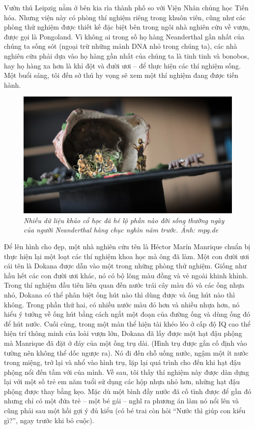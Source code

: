 \begin{multicols}{2}
	Vườn thú Leipzig nằm ở bên kia rìa thành phố so với Viện Nhân chủng học Tiến hóa. Nhưng viện này có phòng thí nghiệm riêng trong khuôn viên, cũng như các phòng thử nghiệm được thiết kế đặc biệt bên trong ngôi nhà nghiên cứu về vượn, được gọi là Pongoland. Vì không ai trong số họ hàng Neanderthal gần nhất của chúng ta sống sót (ngoại trừ những mảnh DNA nhỏ trong chúng ta), các nhà nghiên cứu phải dựa vào họ hàng gần nhất của chúng ta là tinh tinh và bonobos, hay họ hàng xa hơn là khỉ đột và đười ươi -- để thực hiện các thí nghiệm sống. Một buổi sáng, tôi đến sở thú hy vọng sẽ xem một thí nghiệm đang được tiến hành.
	\begin{figure}[H]
		\vspace*{-5pt}
		\centering
		\captionsetup{labelformat= empty, justification=centering}
		\includegraphics[width= 1\linewidth]{4}
		\caption{\small\textit{\color{timhieukhoahoc}Nhiều dữ liệu khảo cổ học đã hé lộ phần nào đời sống thường ngày của người Neanderthal hàng chục nghìn năm trước. Ảnh: mpg.de}}
		\vspace*{-10pt}
	\end{figure}
	Để lên hình cho đẹp, một nhà nghiên cứu tên là Héctor Marín Manrique chuẩn bị thực hiện lại một loạt các thí nghiệm khoa học mà ông đã làm. Một con đười ươi cái tên là Dokana được dẫn vào một trong những phòng thử nghiệm. Giống như hầu hết các con đười ươi khác, nó có bộ lông màu đồng và vẻ ngoài khinh khỉnh. Trong thí nghiệm đầu tiên liên quan đến nước trái cây màu đỏ và các ống nhựa nhỏ, Dokana có thể phân biệt ống hút nào thì dùng được và ống hút nào thì không. Trong phần thứ hai, có nhiều nước màu đỏ hơn và nhiều nhựa hơn, nó hiểu ý tưởng về ống hút bằng cách ngắt một đoạn của đường ống và dùng ống đó để hút nước. Cuối cùng, trong một màn thể hiện tài khéo léo ở cấp độ IQ cao thể hiện trí thông minh của loài vượn lớn, Dokana đã lấy được một hạt đậu phộng mà Manrique đã đặt ở đáy của một ống trụ dài. (Hình trụ được gắn cố định vào tường nên không thể dốc ngược ra). Nó đi đến chỗ uống nước, ngậm một ít nước trong miệng, trở lại và nhổ vào hình trụ, lặp lại quá trình cho đến khi hạt đậu phộng nổi đến tầm với của mình. Về sau, tôi thấy thí nghiệm này được dàn dựng lại với một số trẻ em năm tuổi sử dụng các hộp nhựa nhỏ hơn, những hạt đậu phộng được thay bằng kẹo. Mặc dù một bình đầy nước đã cố tình được để gần đó nhưng chỉ có một đứa trẻ -- một bé gái -- nghĩ ra phương án làm nó nổi lên và cũng phải sau một hồi gợi ý đủ kiểu (có bé trai còn hỏi “Nước thì giúp con kiểu gì?”, ngay trước khi bỏ cuộc).

\end{multicols}
